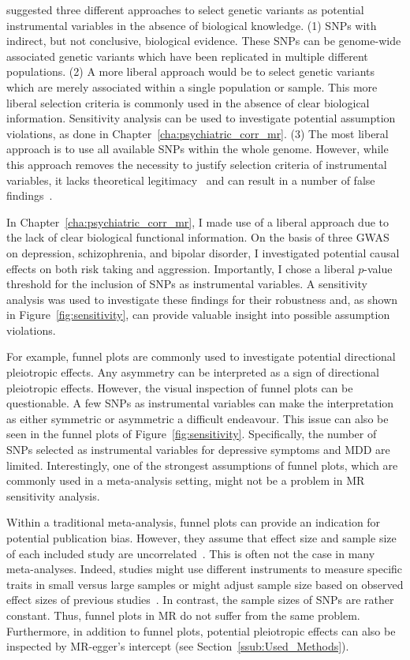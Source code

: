 \citet{Burgess2016a} suggested three different approaches to select genetic variants as potential instrumental  variables in the absence of biological knowledge.
(1) SNPs with indirect, but not conclusive, biological evidence.
These SNPs can be genome-wide associated genetic variants which have been replicated in multiple different populations.
(2) A more liberal approach would be to select genetic variants which are merely associated within a single population or sample.
This more liberal selection criteria is commonly used in the absence of clear biological information.
Sensitivity analysis can be used to investigate potential assumption violations, as done in Chapter~\ref{cha:psychiatric_corr_mr}.
(3) The most liberal approach is to use all available SNPs within the whole genome.
However, while this approach removes the necessity to justify  selection criteria of instrumental variables, it lacks theoretical legitimacy~\cite{Burgess2016a} and can result in a number of false findings~\cite{Evans2013}.

In Chapter~\ref{cha:psychiatric_corr_mr}, I made use of a liberal approach due to the lack of clear biological functional information.
On the basis of three GWAS on depression, schizophrenia, and bipolar disorder, I investigated potential causal effects on both risk taking and aggression.
Importantly, I chose a liberal $p$-value threshold for the inclusion of SNPs as instrumental variables.
A sensitivity analysis was used to investigate these findings for their robustness and, as shown in Figure~\ref{fig:sensitivity}, can provide valuable insight into possible assumption violations.

For example, funnel plots are commonly used to investigate potential directional pleiotropic effects.
Any asymmetry can be interpreted as a sign of directional pleiotropic effects.
However, the visual inspection of funnel plots can be questionable.
A few SNPs as instrumental variables can make the interpretation as either symmetric or asymmetric a difficult endeavour. 
This issue can also be seen in the funnel plots of Figure~\ref{fig:sensitivity}.
Specifically, the number of SNPs selected as instrumental variables for depressive symptoms and MDD are limited. 
Interestingly, one of the strongest assumptions of funnel plots, which are commonly used in a meta-analysis setting, might not be a problem in MR sensitivity analysis.

Within a traditional meta-analysis, funnel plots can provide an indication for potential publication bias.
However, they assume that effect size and sample size of each included study are uncorrelated~\cite{Evans2013}.
This is often not the case in many meta-analyses.
Indeed, studies might use different instruments to measure specific traits in small versus large samples or  might adjust sample size based on observed effect sizes of previous studies~\cite{Simonsohn}.
In contrast, the sample sizes of SNPs are rather constant.
Thus, funnel plots in MR do not suffer from the same problem.
Furthermore, in addition to funnel plots, potential pleiotropic effects can also be inspected by MR-egger's intercept (see Section~\ref{ssub:Used_Methods}).


